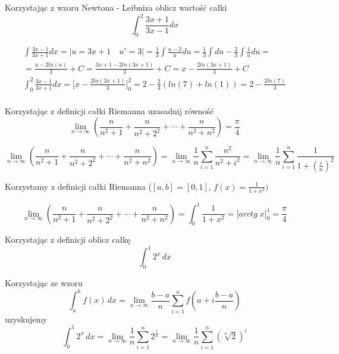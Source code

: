 \documentclass[main.tex]{subfiles}
\begin{document}
    \begin{exercise}
        Korzystając z wzoru Newtona - Leibniza oblicz wartość całki \[\int_0^2 \frac{3x + 1}{3x - 1}dx\]
    \end{exercise}

    \begin{gather*}
        \int\frac{3x - 1}{3x + 1} dx = \big| u = 3x + 1 \quad u' = 3\big| = \frac{1}{3}\int \frac{u - 2}{u}du
        = \frac{1}{3} \int du - \frac{2}{3}\int\frac{1}{u}du =\\
        = \frac{u - 2ln(u)}{3} + C = \frac{3x + 1 - 2ln(3x + 1)}{3} + C = x - \frac{2ln(3x + 1)}{3} + C\\
        \int_0^2\frac{3x - 1}{3x + 1} dx = \big[ x - \frac{2ln(3x + 1)}{3} \big]^2_0 = 2 - \frac{2}{3}(ln(7) + ln(1)) = 2 - \frac{2ln(7)}{3}\\
    \end{gather*}

    \begin{exercise}
        Korzystając z definicji całki Riemanna uzasadnij równość \[\lim_{n \rightarrow \infty} (\frac{n}{n^2 + 1} + \frac{n}{n^2 + 2^2} + \cdots + \frac{n}{n^2 + n^2}) = \frac{\pi}{4}\]
    \end{exercise}

    \[\lim_{n \rightarrow \infty} (\frac{n}{n^2 + 1} + \frac{n}{n^2 + 2^2} + \cdots + \frac{n}{n^2 + n^2}) =
    \lim_{n \rightarrow \infty} \frac{1}{n} \sum_{i =1}^{n} \frac{n^2}{n^2 + i^2} = \lim_{n \rightarrow \infty} \frac{1}{n} \sum_{i =1}^{n} \frac{1}{1 + (\frac{i}{n})^2} \]

    Korzystamy z definicji całki Riemanna ($[a, b] = [0, 1]$, $f(x) = \frac{1}{1 + x^2})$

    \[\lim_{n \rightarrow \infty} (\frac{n}{n^2 + 1} + \frac{n}{n^2 + 2^2} + \cdots + \frac{n}{n^2 + n^2}) = \int_0^1 \frac{1}{1 + x^2}= \big[arctg \; x \big]^1_0 = \frac{\pi}{4}\]

    \begin{exercise}
        Korzystając z definicji oblicz całkę
        \[\int_0^1 2^x \,dx\]
    \end{exercise}

    Korzystając ze wzoru
    \[\int_a^b f(x) \,dx = \lim_{n \rightarrow \infty} \frac{b - a}{n} \sum_{i =1}^{n} f(a + i\frac{b - a}{n}) \]
    uzyskujemy
    \[\int_0^1 2^x \,dx = \lim_{n \rightarrow \infty} \frac{1}{n} \sum_{i =1}^{n} 2^{\frac{i}{n}}
    = \lim_{n \rightarrow \infty} \frac{1}{n} \sum_{i =1}^{n} (\sqrt[n]{2})^i \]
\end{document}
